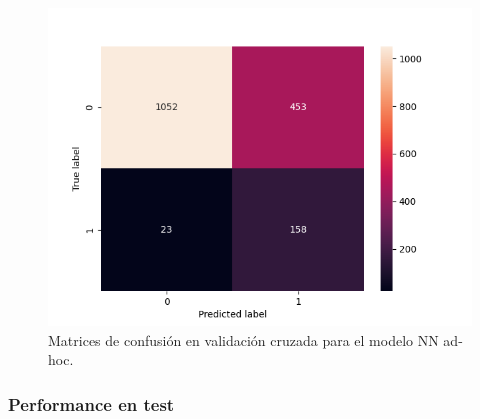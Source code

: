 \begin{figure}[t!]
    \includegraphics[width=\linewidth]{figures/results/ad-hoc/nn/calibrate/2021-12-06_17.03.17.314982_set_5_confusion_matrix_raw.png}
    \endminipage
    \caption{Matrices de confusión en validación cruzada para el modelo NN ad-hoc.}
    \label{fig:calibrate-bestmodel-cm}
\end{figure}

\subsubsection{Performance en test}

